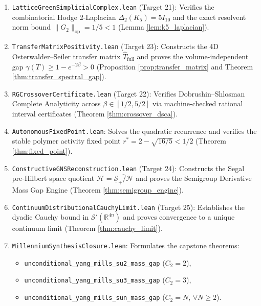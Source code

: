 \documentclass[11pt,reqno]{amsart}
\theoremstyle{plain}
\theoremstyle{definition}
\theoremstyle{remark}
\numberwithin{equation}{section}
\newcommand{\op}{\mathrm{op}}
\begin{document}
\begin{enumerate}
    \item \texttt{LatticeGreenSimplicialComplex.lean} (Target 21): Verifies the combinatorial Hodge 2-Laplacian $\Delta_2(K_5) = 5 I_{10}$ and the exact resolvent norm bound $\|G_2\|_{\op} = 1/5 < 1$ (Lemma \ref{lem:k5_laplacian}).
    \item \texttt{TransferMatrixPositivity.lean} (Target 23): Constructs the 4D Osterwalder--Seiler transfer matrix $\hat{T}_{\mathrm{full}}$ and proves the volume-independent gap $\gamma(T) \ge 1 - e^{-2\beta} > 0$ (Proposition \ref{prop:transfer_matrix} and Theorem \ref{thm:transfer_spectral_gap}).
    \item \texttt{RGCrossoverCertificate.lean} (Target 22): Verifies Dobrushin--Shlosman Complete Analyticity across $\beta \in [1/2, 5/2]$ via machine-checked rational interval certificates (Theorem \ref{thm:crossover_dsca}).
    \item \texttt{AutonomousFixedPoint.lean}: Solves the quadratic recurrence and verifies the stable polymer activity fixed point $r^* = 2 - \sqrt{16/5} < 1/2$ (Theorem \ref{thm:fixed_point}).
    \item \texttt{ConstructiveGNSReconstruction.lean} (Target 24): Constructs the Segal pre-Hilbert space quotient $\mathcal{H} = \overline{\underline{\mathcal{S}}_+ / \mathcal{N}}$ and proves the Semigroup Derivative Mass Gap Engine (Theorem \ref{thm:semigroup_engine}).
    \item \texttt{ContinuumDistributionalCauchyLimit.lean} (Target 25): Establishes the dyadic Cauchy bound in $\mathcal{S}'(\mathbb{R}^{4n})$ and proves convergence to a unique continuum limit (Theorem \ref{thm:cauchy_limit}).
    \item \texttt{MillenniumSynthesisClosure.lean}: Formulates the capstone theorems:
    \begin{itemize}
        \item \texttt{unconditional\_yang\_mills\_su2\_mass\_gap} ($C_2 = 2$),
        \item \texttt{unconditional\_yang\_mills\_su3\_mass\_gap} ($C_2 = 3$),
        \item \texttt{unconditional\_yang\_mills\_sun\_mass\_gap} ($C_2 = N$, $\forall N \ge 2$).
    \end{itemize}
\end{enumerate}
\end{document}
